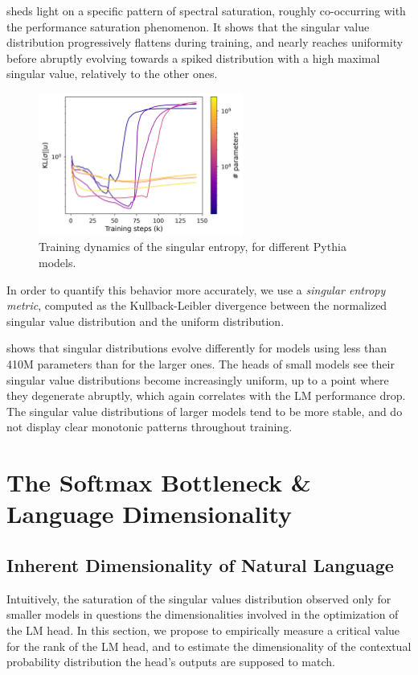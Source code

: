  sheds light on a specific pattern of spectral saturation, roughly co-occurring with the performance saturation phenomenon. It shows that the singular value distribution progressively flattens during training, and nearly reaches uniformity before abruptly evolving towards a spiked distribution with a high maximal singular value, relatively to the other ones.

\begin{figure}[ht]
\centering
    \includegraphics[width=0.6\textwidth]{sources/part_1/softmax_bottleneck/imgs/kullback_uni.png}
    \caption{Training dynamics of the singular entropy, for different Pythia models.}

    \label{fig:kl_div}
\end{figure}

In order to quantify this behavior more accurately, we use a \textit{singular entropy metric}, computed as the Kullback-Leibler divergence between the normalized singular value distribution and the uniform distribution.

 shows that singular distributions evolve differently for models using less than 410M parameters than for the larger ones. The heads of small models see their singular value distributions become increasingly uniform, up to a point where they degenerate abruptly, which again correlates with the LM performance drop. The singular value distributions of larger models tend to be more stable, and do not display clear monotonic patterns throughout training.

\section{The Softmax Bottleneck \& Language Dimensionality}
\subsection{Inherent Dimensionality of Natural Language}
\label{sec:inherent_dim}
Intuitively, the saturation of the singular values distribution observed only for smaller models in  questions the dimensionalities involved in the optimization of the LM head. In this section, we propose to empirically measure a critical value for the rank of the LM head, and to estimate the dimensionality of the contextual probability distribution the head's outputs are supposed to match.

